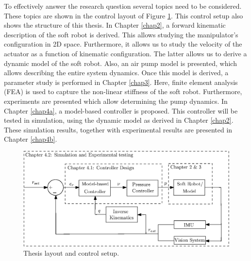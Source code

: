 To effectively answer the research question several topics need to be considered. These topics are shown in the control layout of Figure \ref{fig1:controlarchitecture}. This control setup also shows the structure of this thesis. In Chapter \ref{chap2}, a forward kinematic description of the soft robot is derived. This allows studying the manipulator's configuration in 2D space. Furthermore, it allows us to study the velocity of the actuator as a function of kinematic configuration. The latter allows us to derive a dynamic model of the soft robot. Also, an air pump model is presented, which allows describing the entire system dynamics. Once this model is derived, a parameter study is performed in Chapter \ref{chap3}. Here, finite element analysis (FEA) is used to capture the non-linear stiffness of the soft robot. Furthermore, experiments are presented which allow determining the pump dynamics. In Chapter \ref{chap4a}, a model-based controller is proposed. This controller will be tested in simulation, using the dynamic model as derived in Chapter \ref{chap2}. These simulation results, together with experimental results are presented in Chapter \ref{chap4b}.




\begin{figure}[H]
    \centering
    \includegraphics[width = \textwidth]{Figures/Chapter1/controlschemeintroduct.eps}
    \caption{Thesis layout and control setup.}
    \label{fig1:controlarchitecture}
\end{figure}

